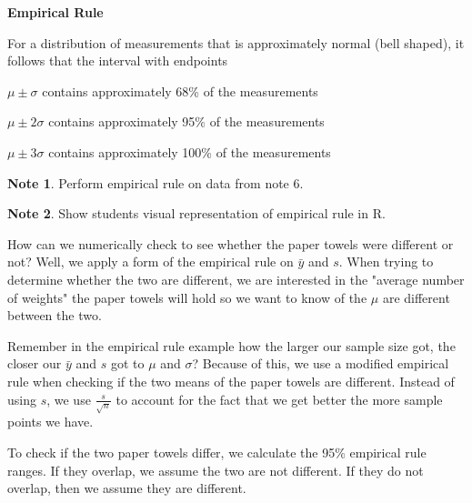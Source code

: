 \documentclass[11pt]{article}
\theoremstyle{definition}
\newtheorem{note}{Note}
\begin{document}
\begin{shaded}

	\textbf{Empirical Rule}
	
	For a distribution of measurements that is approximately normal (bell shaped), it follows that the interval with endpoints
	
	\hspace{10mm} $\mu \pm \sigma$ contains approximately 68\% of the measurements
	
	\hspace{10mm} $\mu \pm 2\sigma$ contains approximately 95\% of the measurements
	
	\hspace{10mm} $\mu \pm 3\sigma$ contains approximately 100\% of the measurements

\end{shaded}

\begin{note}
	Perform empirical rule on data from note 6.
\end{note}

\begin{note}
	Show students visual representation of empirical rule in R.
\end{note}

How can we numerically check to see whether the paper towels were different or not? Well, we apply a form of the empirical rule on $\bar{y}$ and $s$. When trying to determine whether the two are different, we are interested in the "average number of weights" the paper towels will hold so we want to know of the $\mu$ are different between the two.

Remember in the empirical rule example how the larger our sample size got, the closer our $\bar{y}$ and $s$ got to $\mu$ and $\sigma$? Because of this, we use a modified empirical rule when checking if the two means of the paper towels are different. Instead of using $s$, we use $\frac{s}{\sqrt{n}}$ to account for the fact that we get better the more sample points we have.

To check if the two paper towels differ, we calculate the 95\% empirical rule ranges. If they overlap, we assume the two are not different. If they do not overlap, then we assume they are different.
\end{document}
